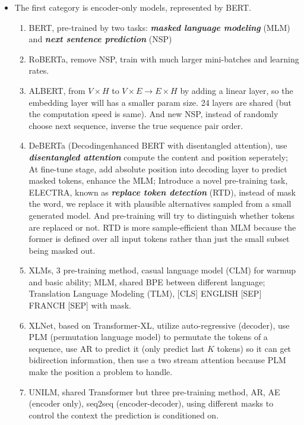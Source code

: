\documentclass[10pt]{elegantbook}
\newcommand{\mydefination}[1]{\textbf{\textit{\textcolor{structurecolor}{#1}}}}
\begin{document}
\begin{itemize}
    \item The first category is encoder-only models, represented by BERT.
    \begin{enumerate}
        \item BERT, pre-trained by two tasks: \mydefination{masked language modeling} (MLM) and \mydefination{next sentence
    prediction} (NSP)
        \item RoBERTa, remove NSP, train with much larger mini-batches and learning rates.
        \item ALBERT, from $V \times H$ to $V \times E \rightarrow E \times H$ by adding a linear layer, so the embedding layer 
    will has a smaller param size. 24 layers are shared (but the computation speed is same). And new NSP, instead of randomly 
    choose next sequence, inverse the true sequence pair order.
        \item DeBERTa (Decodingenhanced BERT with disentangled attention), use \mydefination{disentangled attention} compute 
    the content and position seperately; At fine-tune stage, add absolute position into decoding layer to predict masked tokens,
    enhance the MLM; Introduce a novel pre-training task, ELECTRA, known as \mydefination{replace token detection} (RTD), instead
    of mask the word, we replace it with plausible alternatives sampled from a small generated model. And pre-training will try
    to distinguish whether tokens are replaced or not. RTD is more sample-efficient than MLM because the former
    is defined over all input tokens rather than just the small subset being masked out.
        \item XLMs, 3 pre-training method, casual language model (CLM) for warmup and basic ability; MLM, shared BPE between
    different language; Translation Language Modeling (TLM), [CLS] ENGLISH [SEP] FRANCH [SEP] with mask.
        \item XLNet, based on Transformer-XL, utilize auto-regressive (decoder), use PLM (permutation language model) to 
    permutate the tokens of a sequence, use AR to predict it (only predict last $K$ tokens) so it can get bidirection information,
    then use a two stream attention because PLM make the position a problem to handle.
        \item UNILM, shared Transformer but three pre-training method, AR, AE (encoder only), seq2seq (encoder-decoder), using 
    different masks to control the context the prediction is conditioned on.
    \end{enumerate}


\end{itemize}
\end{document}
